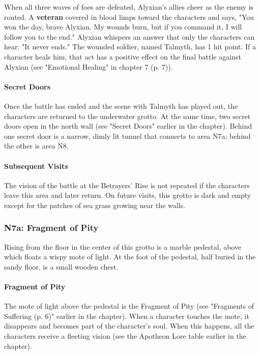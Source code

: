 \documentclass[letterpaper, 11pt, bg=full, twocolumn]{dndbook}
\begin{document}
When all three waves of foes are defeated, Alyxian's allies cheer as the enemy is routed. A \textbf{veteran} covered in blood limps toward the characters and says, "You won the day, brave Alyxian. My wounds burn, but if you command it, I will follow you to the end." Alyxian whispers an answer that only the characters can hear: "It never ends." The wounded soldier, named Talmyth, has 1 hit point. If a character heals him, that act has a positive effect on the final battle against Alyxian (see "Emotional Healing" in chapter 7 (p. 7)).

\paragraph{Secret Doors}

Once the battle has ended and the scene with Talmyth has played out, the characters are returned to the underwater grotto. At the same time, two secret doors open in the north wall (see "Secret Doors" earlier in the chapter). Behind one secret door is a narrow, dimly lit tunnel that connects to area N7a; behind the other is area N8.

\paragraph{Subsequent Visits}

The vision of the battle at the Betrayers' Rise is not repeated if the characters leave this area and later return. On future visits, this grotto is dark and empty except for the patches of sea grass growing near the walls.

\subsubsection{N7a: Fragment of Pity}

\begin{DndReadAloud}
Rising from the floor in the center of this grotto is a marble pedestal, above which floats a wispy mote of light. At the foot of the pedestal, half buried in the sandy floor, is a small wooden chest.
\end{DndReadAloud}

\paragraph{Fragment of Pity}

The mote of light above the pedestal is the Fragment of Pity (see "Fragments of Suffering (p. 6)" earlier in the chapter). When a character touches the mote, it disappears and becomes part of the character's soul. When this happens, all the characters receive a fleeting vision (see the Apotheon Lore table earlier in the chapter).
\end{document}
